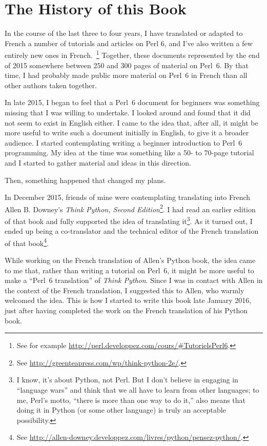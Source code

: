 \section*{The History of this Book}

In the course of the last three to four years, I  
have translated or adapted to French a number of tutorials 
and articles on Perl 6, and I've also written a few entirely 
new ones in French.~\footnote{See for example 
\url{http://perl.developpez.com/cours/\#TutorielsPerl6}.} 
Together, these documents represented by the end of 2015 
somewhere between 250 and 300 pages of material on Perl~6. 
By that time, I had 
probably made public more material on Perl~6 in French than 
all other authors taken together.

In late 2015, I began to feel that a Perl~6 document for beginners 
was something missing that I was willing to undertake. 
I looked around and found that it did not seem to 
exist in English either. I came to the idea that, after all, 
it might be more useful to write such a document initially 
in English, to give it a broader audience. I started contemplating 
writing a beginner introduction to Perl~6 
programming. My idea at the time was something like a 50- to 
70-page tutorial and I started to gather material and ideas 
in this direction.

Then, something happened that changed my plans.

In December 2015, friends of mine were contemplating translating 
into French Allen B. Downey's \emph{Think Python, Second Edition}\footnote{See \url{http://greenteapress.com/wp/think-python-2e/}.}. 
I had read an earlier edition of that book and fully supported 
the idea of translating it\footnote{I know, it's 
about Python, not Perl. But I don't believe in engaging 
in ``language wars'' and think that we all have to learn from 
other languages; to me, Perl's motto, ``there is more than 
one way to do it,'' also means that doing it in Python (or some 
other language) is truly an acceptable possibility.}. As it 
turned out, I ended up being a co-translator and the technical 
editor of the French translation of that book\footnote{See 
\url{http://allen-downey.developpez.com/livres/python/pensez-python/}.}.

While working on the French translation of Allen's Python book, 
the idea came to me that, rather than writing a tutorial on 
Perl~6, it might be more useful to make a ``Perl~6 translation'' 
of \emph{Think Python}. Since I was in contact with Allen in the context 
of the French translation, I suggested this to Allen, who 
warmly welcomed the idea. This is how I started to write this 
book late January 2016, just after having completed the 
work on the French translation of his Python book.

